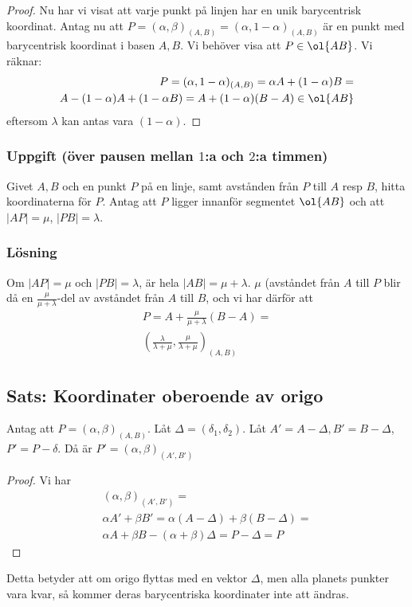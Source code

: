\begin{proof}
    Nu har vi visat att varje punkt på linjen har en unik barycentrisk koordinat.
    Antag nu att $P = (\alpha, \beta)_{(A, B)} = (\alpha, 1-\alpha)_{(A, B)}$ är en punkt
    med barycentrisk koordinat i basen $A, B$. Vi behöver visa att $P\in \ol{AB}$.
    Vi räknar:
    \begin{eqnarray*}
    P = (\alpha, 1-\alpha)_{(A, B)} = \alpha A + (1-\alpha) B = \\
    A - (1-\alpha) A + (1-\alpha B) = A + (1-\alpha)(B-A) \in \ol{AB}
    \end{eqnarray*}
    eftersom $\lambda$ kan antas vara $(1-\alpha)$.
\end{proof}


\subsubsection{Uppgift (över pausen mellan $1$:a och $2$:a timmen)}
\label{sssec:ratio}
Givet $A,B$ och en punkt $P$ på en linje, samt avstånden från $P$ till $A$ resp $B$, hitta koordinaterna för $P$.
Antag att $P$ ligger innanför segmentet $\ol{AB}$ och att $|AP| = \mu$, $|PB| = \lambda$.
\myLine
\subsubsection*{Lösning}
Om $|AP| = \mu$ och $|PB| = \lambda$, är hela $|AB| = \mu + \lambda$.
$\mu$ (avståndet från $A$ till $P$ blir då en $\frac{\mu}{\mu + \lambda}$-del av
avståndet från $A$ till $B$, och vi har därför att
\begin{eqnarray*}
P = A + \frac{\mu}{\mu + \lambda} (B - A) =\\
\left( \frac{\lambda}{\lambda + \mu}, \frac{\mu}{\lambda + \mu} \right)_{(A, B)} 
\end{eqnarray*}

\subsection{Sats: Koordinater oberoende av origo}
\begin{theorem}
\label{thm:dim-1-oberoende-av-origo}
    Antag att $P = (\alpha, \beta)_{(A, B)}$.
    Låt $\Delta = (\delta_1, \delta_2)$.
    Låt $A' = A-\Delta, B' = B - \Delta$,
    $P' = P-\delta$.
    Då är $P' = (\alpha, \beta)_{(A', B')}$
\end{theorem}
\begin{proof}
    Vi har 
    \begin{eqnarray*}
    (\alpha, \beta)_{(A', B')} = \\
    \alpha A' + \beta B' = \alpha(A - \Delta) + \beta (B - \Delta) = \\
    \alpha A + \beta B - (\alpha + \beta) \Delta = P - \Delta = P
    \end{eqnarray*}
\end{proof}
Detta betyder att om origo flyttas med en vektor $\Delta$, men alla planets punkter vara kvar,
så kommer deras barycentriska koordinater inte att ändras.

